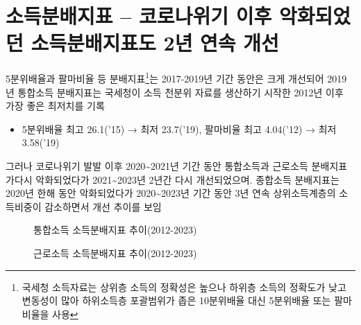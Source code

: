 \documentclass[
  a4paper,
  oneside,
  open=any]{scrbook}
\providecommand{\tightlist}{%
  \setlength{\itemsep}{0pt}\setlength{\parskip}{0pt}}\usepackage{longtable,booktabs,array}
\begin{document}
\section{소득분배지표 -- 코로나위기 이후 악화되었던 소득분배지표도 2년
연속
개선}\label{uxc18cuxb4dduxbd84uxbc30uxc9c0uxd45c-uxcf54uxb85cuxb098uxc704uxae30-uxc774uxd6c4-uxc545uxd654uxb418uxc5c8uxb358-uxc18cuxb4dduxbd84uxbc30uxc9c0uxd45cuxb3c4-2uxb144-uxc5f0uxc18d-uxac1cuxc120}

5분위배율과 팔마비율 등 분배지표\footnote{국세청 소득자료는 상위층
  소득의 정확성은 높으나 하위층 소득의 정확도가 낮고 변동성이 많아
  하위소득층 포괄범위가 좁은 10분위배율 대신 5분위배율 또는 팔마비율을
  사용}는 2017-2019년 기간 동안은 크게 개선되어 2019년 통합소득
분배지표는 국세청이 소득 천분위 자료를 생산하기 시작한 2012년 이후 가장
좋은 최저치를 기록

\begin{itemize}
\tightlist
\item
  5분위배율 최고 26.1('15) → 최저 23.7('19), 팔마비율 최고 4.04('12) →
  최저 3.58('19)
\end{itemize}

그러나 코로나위기 발발 이후 2020\textasciitilde2021년 기간 동안
통합소득과 근로소득 분배지표가다시 악화되었다가
2021\textasciitilde2023년 2년간 다시 개선되었으며. 종합소득 분배지표는
2020년 한해 동안 악화되었다가 2020\textasciitilde2023년 기간 동안 3년
연속 상위소득계층의 소득비중이 감소하면서 개선 추이를 보임

\begin{figure}

\caption{\label{fig-dis1}통합소득 소득분배지표 추이(2012-2023)}


\end{figure}%

\begin{figure}

\caption{\label{fig-dis2}근로소득 소득분배지표 추이(2012-2023)}


\end{figure}%
\end{document}
